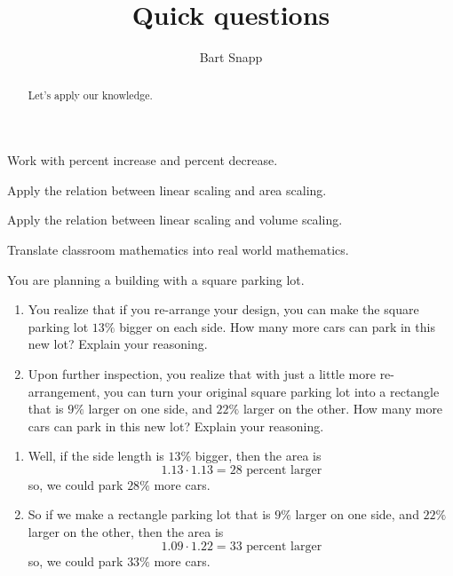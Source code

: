 \documentclass[nooutcomes,noauthor,handout]{ximera}
\title{Quick questions}
\author{Bart Snapp}
\begin{document}
\begin{abstract}
  Let's apply our knowledge.
\end{abstract}
\maketitle


\begin{listOutcomes}
\item Work with percent increase and percent decrease.
\item Apply the relation between linear scaling and area scaling.
\item Apply the relation between linear scaling and volume scaling.
\item Translate classroom mathematics into real world mathematics. 
\end{listOutcomes}

\mynewpage


\begin{question}
  You are planning a building with a square parking lot.
  \begin{enumerate}
  \item You realize that if you re-arrange your design, you can make
    the square parking lot $13\%$ bigger on each side. How many more
    cars can park in this new lot? Explain your reasoning.
  \item Upon further inspection, you realize that with just a little
    more re-arrangement, you can turn your original square parking lot
    into a rectangle that is $9\%$ larger on one side, and $22\%$
    larger on the other. How many more cars can park in this new lot?
    Explain your reasoning.
  \end{enumerate}
  \begin{freeResponse}
    \begin{enumerate}
    \item Well, if the side length is $13\%$ bigger, then the area is
      \[
      1.13\cdot 1.13 = \text{$28$ percent larger}
      \]
      so, we could park $28\%$ more cars.
    \item So if we make a rectangle parking lot that is $9\%$ larger on
      one side, and $22\%$ larger on the other, then the area is
      \[
      1.09\cdot 1.22 = \text{$33$ percent larger}
      \]
      so, we could park $33\%$ more cars.
    \end{enumerate}
  \end{freeResponse}
\end{question}
\mynewpage
\end{document}
